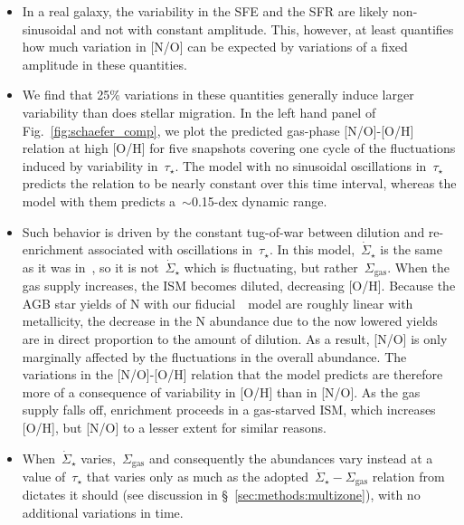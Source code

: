 \documentclass[ms.tex]{subfiles}
\begin{document}
\begin{itemize}
	\item In a real galaxy, the variability in the SFE and the SFR are likely 
	non-sinusoidal and not with constant amplitude. 
	This, however, at least quantifies how much variation in [N/O] can be 
	expected by variations of a fixed amplitude in these quantities. 

	\item We find that 25\% variations in these quantities generally induce 
	larger variability than does stellar migration. 
	In the left hand panel of Fig.~\ref{fig:schaefer_comp}, we plot the 
	predicted gas-phase [N/O]-[O/H] relation at high [O/H] for five snapshots 
	covering one cycle of the fluctuations induced by variability 
	in~$\tau_\star$. 
	The model with no sinusoidal oscillations in~$\tau_\star$ predicts the 
	relation to be nearly constant over this time interval, whereas the model 
	with them predicts a~$\sim$0.15-dex dynamic range. 

	\item Such behavior is driven by the constant tug-of-war between dilution 
	and re-enrichment associated with oscillations in~$\tau_\star$. 
	In this model,~$\dot{\Sigma}_\star$ is the same as it was 
	in~\citet{Johnson2021}, so it is not~$\dot{\Sigma}_\star$ which is 
	fluctuating, but rather~$\Sigma_\text{gas}$. 
	When the gas supply increases, the ISM becomes diluted, decreasing [O/H]. 
	Because the AGB star yields of N with our fiducial~\cristallo~model are 
	roughly linear with metallicity, the decrease in the N abundance due to the 
	now lowered yields are in direct proportion to the amount of dilution. 
	As a result, [N/O] is only marginally affected by the fluctuations in the 
	overall abundance. 
	The variations in the [N/O]-[O/H] relation that the model predicts are 
	therefore more of a consequence of variability in [O/H] than in [N/O]. 
	As the gas supply falls off, enrichment proceeds in a gas-starved ISM, 
	which increases [O/H], but [N/O] to a lesser extent for similar reasons. 

	\item When~$\dot{\Sigma}_\star$ varies,~$\Sigma_\text{gas}$ and 
	consequently the abundances vary instead at a value of~$\tau_\star$ that 
	varies only as much as the adopted~$\dot{\Sigma}_\star - \Sigma_\text{gas}$ 
	relation from~\citet{Johnson2021} dictates it should (see discussion in 
	\S~\ref{sec:methods:multizone}), with no additional variations in time. 


\end{itemize}
\end{document}
